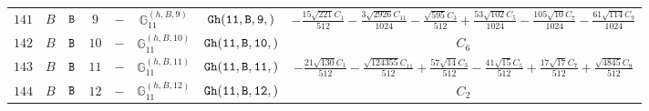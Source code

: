 \documentclass[fleqn,8pt]{jsarticle}
\begin{document}
\begin{table}[ht!]
\begin{center}
\begin{tabular}{cccccccc}
$ 141 $ & $ B $ & $ {\tt B} $ & $ 9 $ & $ - $ & $ \mathbb{G}_{11}^{(h,B,9)} $ & $ {\tt Gh(11,B,9,)} $ & $ - \frac{15 \sqrt{221} C_{1}}{512} - \frac{3 \sqrt{2926} C_{11}}{1024} - \frac{\sqrt{595} C_{3}}{512} + \frac{53 \sqrt{102} C_{5}}{1024} - \frac{105 \sqrt{10} C_{7}}{1024} - \frac{61 \sqrt{114} C_{9}}{1024} $ \\
$ 142 $ & $ B $ & $ {\tt B} $ & $ 10 $ & $ - $ & $ \mathbb{G}_{11}^{(h,B,10)} $ & $ {\tt Gh(11,B,10,)} $ & $ C_{6} $ \\
$ 143 $ & $ B $ & $ {\tt B} $ & $ 11 $ & $ - $ & $ \mathbb{G}_{11}^{(h,B,11)} $ & $ {\tt Gh(11,B,11,)} $ & $ - \frac{21 \sqrt{130} C_{1}}{512} - \frac{\sqrt{124355} C_{11}}{512} + \frac{57 \sqrt{14} C_{3}}{512} - \frac{41 \sqrt{15} C_{5}}{512} + \frac{17 \sqrt{17} C_{7}}{512} + \frac{\sqrt{4845} C_{9}}{512} $ \\
$ 144 $ & $ B $ & $ {\tt B} $ & $ 12 $ & $ - $ & $ \mathbb{G}_{11}^{(h,B,12)} $ & $ {\tt Gh(11,B,12,)} $ & $ C_{2} $ \\
 \hline \hline
\end{tabular}
\end{center}
\end{table}
\end{document}
